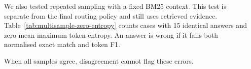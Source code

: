 We also tested repeated sampling with a fixed BM25 context. This test is separate from the final routing policy and still uses retrieved evidence. Table~\ref{tab:multisample-zero-entropy} counts cases with 15 identical answers and zero mean maximum token entropy. An answer is wrong if it fails both normalised exact match and token F1.

\begin{table}[h]
    \centering
    \caption[Repeated-Sampling Errors]{Repeated-sampling agreement and errors.}
    \label{tab:multisample-zero-entropy}
    \setlength{\tabcolsep}{5pt}
    \small
\end{table}

When all samples agree, disagreement cannot flag these errors.
